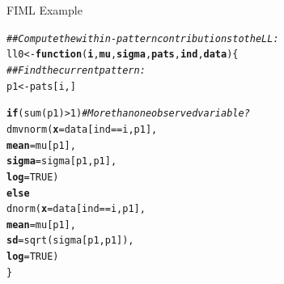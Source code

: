 \documentclass{beamer}\usepackage[]{graphicx}\usepackage[]{color}
\makeatletter
\newcommand{\hlnum}[1]{\textcolor[rgb]{0.69,0.494,0}{#1}}%
\newcommand{\hlcom}[1]{\textcolor[rgb]{0.514,0.506,0.514}{\textit{#1}}}%
\newcommand{\hlopt}[1]{\textcolor[rgb]{0,0,0}{#1}}%
\newcommand{\hlstd}[1]{\textcolor[rgb]{0,0,0}{#1}}%
\newcommand{\hlkwa}[1]{\textcolor[rgb]{0,0,0}{\textbf{#1}}}%
\newcommand{\hlkwb}[1]{\textcolor[rgb]{0,0.341,0.682}{#1}}%
\newcommand{\hlkwc}[1]{\textcolor[rgb]{0,0,0}{\textbf{#1}}}%
\newcommand{\hlkwd}[1]{\textcolor[rgb]{0.004,0.004,0.506}{#1}}%
\newenvironment{kframe}{%
 \def\at@end@of@kframe{}%
 \ifinner\ifhmode%
  \def\at@end@of@kframe{\end{minipage}}%
  \begin{minipage}{\columnwidth}%
 \fi\fi%
 \def\FrameCommand##1{\hskip\@totalleftmargin \hskip-\fboxsep
 \colorbox{shadecolor}{##1}\hskip-\fboxsep
     \hskip-\linewidth \hskip-\@totalleftmargin \hskip\columnwidth}%
 \MakeFramed {\advance\hsize-\width
   \@totalleftmargin\z@ \linewidth\hsize
   \@setminipage}}%
 {\par\unskip\endMakeFramed%
 \at@end@of@kframe}
\newenvironment{knitrout}{}{} %
\makeatother
\begin{document}

\begin{frame}[fragile]{FIML Example}

\begin{knitrout}\footnotesize
{}\color{fgcolor}\begin{kframe}
\begin{alltt}
\hlcom{## Compute the within-pattern contributions to the LL:}
\hlstd{ll0} \hlkwb{<-} \hlkwa{function}\hlstd{(}\hlkwc{i}\hlstd{,} \hlkwc{mu}\hlstd{,} \hlkwc{sigma}\hlstd{,} \hlkwc{pats}\hlstd{,} \hlkwc{ind}\hlstd{,} \hlkwc{data}\hlstd{) \{}
    \hlcom{## Find the current pattern:}
    \hlstd{p1} \hlkwb{<-} \hlstd{pats[i, ]}

    \hlkwa{if}\hlstd{(}\hlkwd{sum}\hlstd{(p1)} \hlopt{>} \hlnum{1}\hlstd{)} \hlcom{# More than one observed variable?}
        \hlkwd{dmvnorm}\hlstd{(}\hlkwc{x}     \hlstd{= data[ind} \hlopt{==} \hlstd{i, p1],}
                \hlkwc{mean}  \hlstd{= mu[p1],}
                \hlkwc{sigma} \hlstd{= sigma[p1, p1],}
                \hlkwc{log}   \hlstd{=} \hlnum{TRUE}\hlstd{)}
    \hlkwa{else}
        \hlkwd{dnorm}\hlstd{(}\hlkwc{x}    \hlstd{= data[ind} \hlopt{==} \hlstd{i, p1],}
              \hlkwc{mean} \hlstd{= mu[p1],}
              \hlkwc{sd}   \hlstd{=} \hlkwd{sqrt}\hlstd{(sigma[p1, p1]),}
              \hlkwc{log}  \hlstd{=} \hlnum{TRUE}\hlstd{)}
\hlstd{\}}
\end{alltt}
\end{kframe}
\end{knitrout}

\end{frame}

\end{document}
